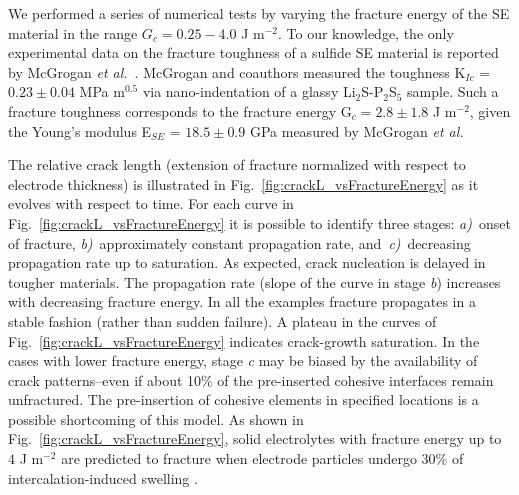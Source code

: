 \documentclass[final,5p,sort&compress]{elsarticle}
\begin{document}
We performed a series of numerical tests by varying the fracture energy of the SE material in the range $G_c = 0.25 - 4.0$ J m$^{-2}$.
%
To our knowledge, the only experimental data on the fracture toughness of a sulfide SE material is reported by McGrogan \emph{et al.}~\cite{McGrogan2016}. McGrogan and coauthors measured the toughness K$_{Ic}$ = $0.23 \pm 0.04$ MPa m$^{0.5}$ via nano-indentation of a glassy Li$_2$S-P$_2$S$_5$ sample. Such a fracture toughness corresponds to the fracture energy 
G$_c = 2.8 \pm 1.8 $ J m$^{-2}$, given the Young's modulus
E$_{SE}$ = $18.5 \pm 0.9$ GPa measured by McGrogan \emph{et al.}
%

%

The relative crack length (extension of fracture normalized with respect to electrode thickness) is illustrated in Fig.~\ref{fig:crackL_vsFractureEnergy} as it evolves with respect to time. 
%
For each curve in Fig.~\ref{fig:crackL_vsFractureEnergy} it is possible to identify three stages: \emph{a)}~onset of fracture, \emph{b)}~approximately constant propagation rate, and~\emph{c)}~decreasing propagation rate up to saturation. As expected, crack nucleation is delayed in tougher materials. The propagation rate (slope of the curve in stage \emph{b}) increases with decreasing fracture energy. 
%
In all the examples fracture propagates in a stable fashion (rather than sudden failure).
A plateau in the curves of Fig.~\ref{fig:crackL_vsFractureEnergy} 
indicates crack-growth saturation.  
In the cases with lower fracture energy, stage \emph{c} may be biased by the availability of crack patterns--even if about 10\% of the pre-inserted cohesive interfaces remain unfractured.
The pre-insertion of cohesive elements in specified locations is a possible shortcoming of this model.
%
As shown in Fig.~\ref{fig:crackL_vsFractureEnergy}, solid electrolytes with fracture energy up to $4$ J m$^{-2}$ are predicted to fracture when electrode particles undergo 30\% of intercalation-induced swelling .
\end{document}
